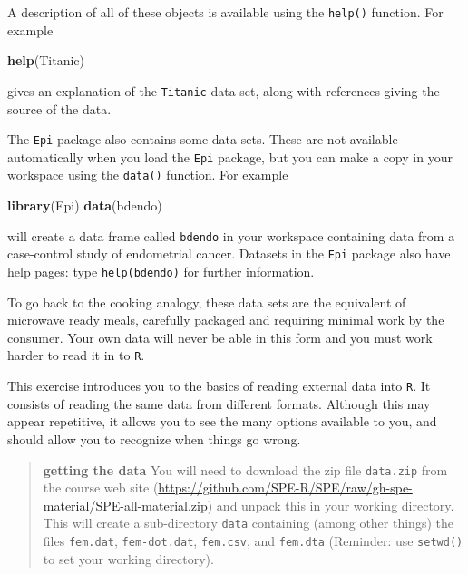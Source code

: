 \documentclass[
]{book}
\newenvironment{Shaded}{\begin{snugshade}}{\end{snugshade}}
\newcommand{\FunctionTok}[1]{\textcolor[rgb]{0.13,0.29,0.53}{\textbf{#1}}}
\newcommand{\NormalTok}[1]{#1}
\begin{document}
A description of all of these objects is available using the \texttt{help()}
function. For example

\begin{Shaded}
\begin{Highlighting}[]
\FunctionTok{help}\NormalTok{(Titanic)}
\end{Highlighting}
\end{Shaded}

gives an explanation of the \texttt{Titanic} data set, along with
references giving the source of the data.

The \texttt{Epi} package also contains some data sets. These are not
available automatically when you load the \texttt{Epi} package, but
you can make a copy in your workspace using the \texttt{data()}
function. For example

\begin{Shaded}
\begin{Highlighting}[]
\FunctionTok{library}\NormalTok{(Epi)}
\FunctionTok{data}\NormalTok{(bdendo)}
\end{Highlighting}
\end{Shaded}

will create a data frame called \texttt{bdendo} in your workspace
containing data from a case-control study of endometrial cancer.
Datasets in the \texttt{Epi} package also have help pages: type
\texttt{help(bdendo)} for further information.

To go back to the cooking analogy, these data sets are the equivalent
of microwave ready meals, carefully packaged and requiring minimal
work by the consumer. Your own data will never be able in this form
and you must work harder to read it in to \texttt{R}.

This exercise introduces you to the basics of reading external data
into \texttt{R}. It consists of reading the same data from different
formats. Although this may appear repetitive, it allows you to see
the many options available to you, and should allow you to recognize
when things go wrong.

\begin{quote}
\textbf{getting the data} You will need to download the zip file \texttt{data.zip} from the course web site (\url{https://github.com/SPE-R/SPE/raw/gh-spe-material/SPE-all-material.zip}) and unpack this in your working directory. This will create a sub-directory \texttt{data} containing (among other things) the files \texttt{fem.dat}, \texttt{fem-dot.dat}, \texttt{fem.csv}, and \texttt{fem.dta} (Reminder: use \texttt{setwd()} to set
your working directory).
\end{quote}
\end{document}
